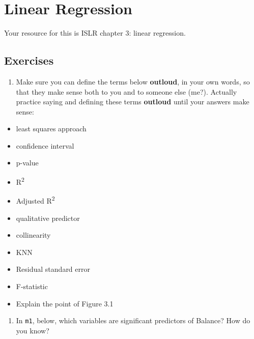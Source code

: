 \documentclass[
]{book}
\providecommand{\tightlist}{%
  \setlength{\itemsep}{0pt}\setlength{\parskip}{0pt}}
\begin{document}
\hypertarget{linear-regression}{%
\chapter{Linear Regression}\label{linear-regression}}

Your resource for this is ISLR chapter 3: linear regression.

\hypertarget{exercises}{%
\section{Exercises}\label{exercises}}

\begin{enumerate}
\def\labelenumi{\arabic{enumi}.}
\tightlist
\item
  Make sure you can define the terms below \textbf{outloud}, in your own words, so that they make sense both to you and to someone else (me?). Actually practice saying and defining these terms \textbf{outloud} until your answers make sense:
\end{enumerate}

\begin{itemize}
\tightlist
\item
  least squares approach
\item
  confidence interval
\item
  p-value
\item
  R\textsuperscript{2}
\item
  Adjusted R\textsuperscript{2}
\item
  qualitative predictor
\item
  collinearity
\item
  KNN
\item
  Residual standard error
\item
  F-statistic
\item
  Explain the point of Figure 3.1
\end{itemize}

\begin{enumerate}
\def\labelenumi{\arabic{enumi}.}
\setcounter{enumi}{1}
\tightlist
\item
  In \texttt{m1}, below, which variables are significant predictors of Balance? How do you know?
\end{enumerate}
\end{document}
